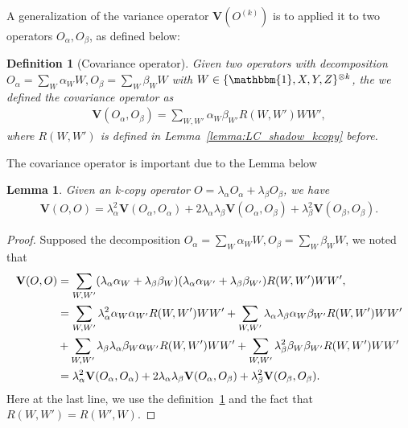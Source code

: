 \documentclass[aps,%
twocolumn,%
floatfix,%
pra,%
amsfonts,%
groupedaddress,%
superscriptaddress]{revtex4-2}%
\newtheorem{lemma}{Lemma}
\newtheorem{definition}{Definition}[section]
\newcommand{\1}{\mathbbm{1}}
\begin{document}
A generalization of the variance operator $\mathbf{V}(O^{(k)})$ is to applied it to two operators $O_\alpha,O_\beta$, as defined below:
\begin{definition}[Covariance operator]
    \label{def:cov_oper}
    Given two operators with decomposition $O_\alpha = \sum_{W} \alpha_{W} W, O_\beta = \sum_{W} \beta_{W} W$ with $W \in \{\1,X,Y,Z\}^{\otimes k}$, the we defined the covariance operator as 
    \begin{align}
        \mathbf{V}(O_\alpha,O_\beta) = \sum_{W,W'} \alpha_{W} \beta_{W'} R(W,W') WW',
    \end{align}
    where $R(W,W')$ is defined in Lemma~\ref{lemma:LC_shadow_kcopy} before.
\end{definition}
The covariance operator is important due to the Lemma below
\begin{lemma}
    \label{lemma:covariance_decomp}
    Given an k-copy operator $O = \lambda_{\alpha} O_{\alpha} + \lambda_{\beta} O_{\beta}$, we have \begin{align}
        \mathbf{V}(O,O) = \lambda_{\alpha}^2 \mathbf{V}(O_{\alpha},O_{\alpha}) + 2 \lambda_{\alpha} \lambda_{\beta} \mathbf{V}(O_{\alpha},O_{\beta}) + \lambda_{\beta}^2 \mathbf{V}(O_{\beta},O_{\beta}).
    \end{align}
\end{lemma}
\begin{proof}
    Supposed the decomposition $O_\alpha = \sum_{W} \alpha_{W} W, O_\beta = \sum_{W} \beta_{W} W$, we noted that 
    \begin{align}
        \mathbf{V}(O,O) &=  \sum_{W,W'} (\lambda_{\alpha}\alpha_{W} + \lambda_{\beta} \beta_{W})(\lambda_{\alpha}\alpha_{W'} + \lambda_{\beta} \beta_{W'}) R(W,W') WW',\\
        &=  \sum_{W,W'} \lambda^2_{\alpha}\alpha_{W}\alpha_{W'}R(W,W') WW' +\sum_{W,W'}  \lambda_{\alpha}\lambda_{\beta} \alpha_{W}\beta_{W'}R(W,W') WW' \notag\\
        & +\sum_{W,W'}  \lambda_{\beta} \lambda_{\alpha}\beta_{W}\alpha_{W'}R(W,W') WW' + \sum_{W,W'} \lambda^2_{\beta}\beta_{W}\beta_{W'}R(W,W') WW'\\
        &=\lambda_{\alpha}^2 \mathbf{V}(O_{\alpha},O_{\alpha}) + 2 \lambda_{\alpha} \lambda_{\beta} \mathbf{V}(O_{\alpha},O_{\beta}) + \lambda_{\beta}^2 \mathbf{V}(O_{\beta},O_{\beta}).
    \end{align}
    Here at the last line, we use the definition~\ref{def:cov_oper} and the fact that $R(W,W') = R(W',W)$. 
\end{proof}
\end{document}
